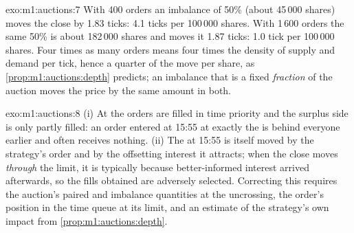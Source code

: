 \begin{solution}{exo:m1:auctions:7}
With 400 orders an imbalance of 50\% (about 45\,000 shares) moves the close
by 1.83 ticks: 4.1 ticks per 100\,000 shares. With 1\,600 orders the same
50\% is about 182\,000 shares and moves it 1.87 ticks: 1.0 tick per 100\,000
shares. Four times as many orders means four times the density of supply and
demand per tick, hence a quarter of the move per share, as
\cref{prop:m1:auctions:depth} predicts; an imbalance that is a fixed
\emph{fraction} of the auction moves the price by the same amount in both.
\end{solution}

\begin{solution}{exo:m1:auctions:8}
(i) At the  orders are filled in time priority and the
surplus side is only partly filled: an order entered at 15:55 at exactly the
 is behind everyone earlier and often receives nothing. (ii) The
 at 15:55 is itself moved by the strategy's order and by the
offsetting interest it attracts; when the close moves \emph{through} the
limit, it is typically because better-informed interest arrived afterwards,
so the fills obtained are adversely selected. Correcting this requires the
auction's paired and imbalance quantities at the uncrossing, the order's
position in the time queue at its limit, and an estimate of the strategy's
own impact from \cref{prop:m1:auctions:depth}.
\end{solution}

